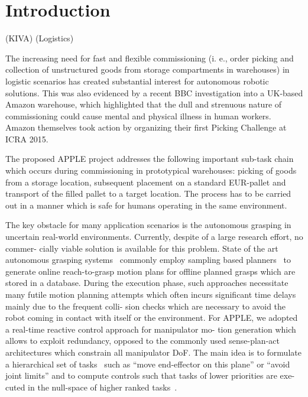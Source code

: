 \section{Introduction}
\label{sec:intro}
%
\cite{Wurm08}(KIVA) \cite{Eche08}(Logistics)

The increasing need for fast and flexible commissioning (i. e., order picking and collection of
unstructured goods from storage compartments in warehouses) in logistic scenarios has created
substantial interest for autonomous robotic solutions. This was also evidenced by a recent BBC
investigation into a UK-based Amazon warehouse, which highlighted that the dull and strenuous nature
of commissioning could cause mental and physical illness in human workers. Amazon themselves took
action by organizing their first Picking Challenge at ICRA 2015.

The proposed APPLE project addresses the following important sub-task chain which occurs during
commissioning in prototypical warehouses: picking of goods from a storage location, subsequent
placement on a standard EUR-pallet and transport of the filled pallet to a target location. The
process has to be carried out in a manner which is safe for humans operating in the same
environment.

The key obstacle for many application scenarios is the autonomous grasping in uncertain real-world
environments. Currently, despite of a large research effort, no commer- cially viable solution is
available for this problem. State of the art autonomous grasping systems~\cite{Bere07, Srin10,
  Krug14a} commonly employ sampling based planners~\cite{LaVa06} to generate online reach-to-grasp
motion plans for offline planned grasps which are stored in a database.  During the execution phase,
such approaches necessitate many futile motion planning attempts which often incurs significant time
delays mainly due to the frequent colli- sion checks which are necessary to avoid the robot coming
in contact with itself or the environment.  For APPLE, we adopted a real-time reactive control
approach for manipulator mo- tion generation which allows to exploit redundancy, opposed to the
commonly used sense-plan-act architectures which constrain all manipulator DoF. The main idea is to
formulate a hierarchical set of tasks~\cite{Sams91} such as “move end-effector on this plane” or
“avoid joint limits” and to compute controls such that tasks of lower priorities are exe- cuted in
the null-space of higher ranked tasks~\cite{Sici91, Sent10}.

